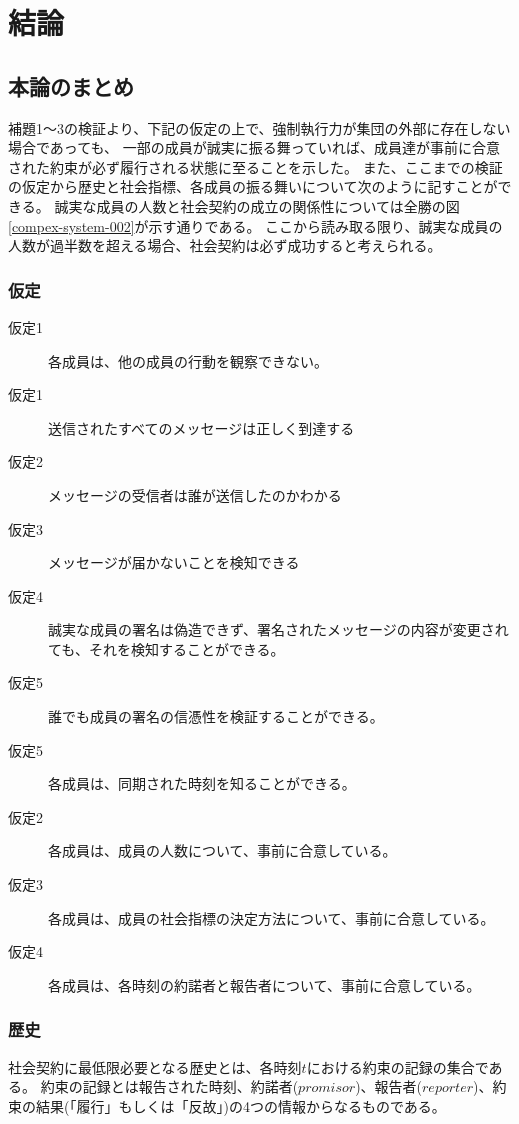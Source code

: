 \chapter{結論}
\section{本論のまとめ}
補題1〜3の検証より、下記の仮定の上で、強制執行力が集団の外部に存在しない場合であっても、
一部の成員が誠実に振る舞っていれば、成員達が事前に合意された約束が必ず履行される状態に至ることを示した。
また、ここまでの検証の仮定から歴史と社会指標、各成員の振る舞いについて次のように記すことができる。
誠実な成員の人数と社会契約の成立の関係性については全勝の図\ref{compex-system-002}が示す通りである。
ここから読み取る限り、誠実な成員の人数が過半数を超える場合、社会契約は必ず成功すると考えられる。

\subsection{仮定}
\begin{description}
  \item[仮定1] 各成員は、他の成員の行動を観察できない。  
  \item[仮定1] 送信されたすべてのメッセージは正しく到達する
  \item[仮定2] メッセージの受信者は誰が送信したのかわかる
  \item[仮定3] メッセージが届かないことを検知できる
  \item[仮定4] 誠実な成員の署名は偽造できず、署名されたメッセージの内容が変更されても、それを検知することができる。
  \item[仮定5] 誰でも成員の署名の信憑性を検証することができる。
  \item[仮定5] 各成員は、同期された時刻を知ることができる。 
  \item[仮定2] 各成員は、成員の人数について、事前に合意している。
  \item[仮定3] 各成員は、成員の社会指標の決定方法について、事前に合意している。
  \item[仮定4] 各成員は、各時刻の約諾者と報告者について、事前に合意している。
\end{description}

\subsection{歴史}
社会契約に最低限必要となる歴史とは、各時刻$t$における約束の記録の集合である。
約束の記録とは報告された時刻、約諾者($promisor$)、報告者($reporter$)、約束の結果(「履行」もしくは「反故」)の4つの情報からなるものである。

